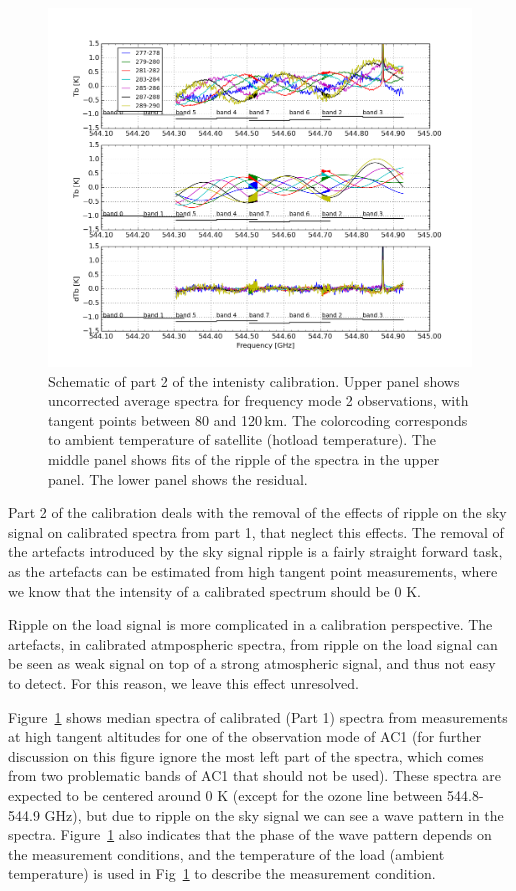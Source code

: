 \begin{figure}[t]
\includegraphics[width=14cm]{calibration_step2_fig.png}
\caption{Schematic of part 2 of the intenisty calibration.
Upper panel shows uncorrected average spectra for frequency mode 2 observations,
with tangent points between 80 and 120\,km. The colorcoding corresponds
to ambient temperature of satellite (hotload temperature).
The middle panel shows fits of the ripple of the spectra in the 
upper panel. The lower panel shows the residual.}
\label{fig:ripple1}
\end{figure}



Part 2 of the calibration deals with the removal
of the effects of ripple on the sky signal on calibrated
spectra from part 1, that neglect this effects.
The removal of the artefacts introduced by the sky signal
ripple is a fairly straight forward task, as the artefacts
can be estimated from high tangent point measurements,
where we know that the intensity of a calibrated spectrum should be 0 K.

Ripple on the load signal is more complicated in 
a calibration perspective. The artefacts, in calibrated
atmpospheric spectra, from ripple on the
load signal can be seen as weak signal on top of a strong
atmospheric signal, and thus not easy to detect.
For this reason, we leave this effect unresolved.

Figure~\ref{fig:ripple1} shows median spectra of calibrated (Part 1) spectra
from measurements at high tangent altitudes for one of the
observation mode of AC1 (for further discussion on this figure
ignore the most left part of the spectra, which comes from two 
problematic bands of AC1 that should not be used). 
These spectra are expected to be 
centered around 0 K (except for the ozone line between 544.8-544.9 GHz), 
but due to ripple on the sky signal we can see a wave pattern in the spectra.
Figure~\ref{fig:ripple1} also indicates that the phase of the wave pattern
depends on the measurement conditions, and the temperature of
the load (ambient temperature) is used in Fig~\ref{fig:ripple1}
to describe the measurement condition.


